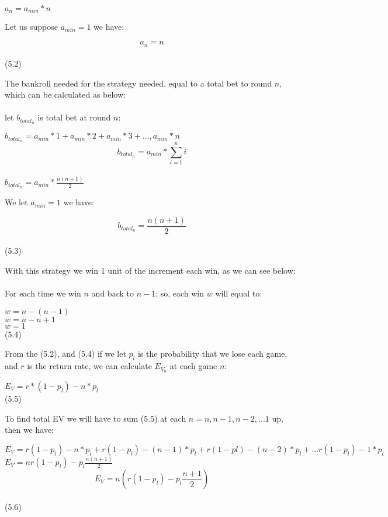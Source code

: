 \documentclass{article}
\begin{document}
\begin{center}
$a_n=a_{min}*n$\\
\end{center}
Let us suppose $a_{min}=1$ we have:\par
\begin{center}
$$a_n=n$$\\
(5.2)
\end{center}
The bankroll needed for the strategy needed, equal to a total bet to round $n$, which can be calculated as below: \\
\\
let $b_{total_n}$ is total bet at round $n$:\par
\begin{center}
$b_{total_n}=a_{min}*1+a_{min}*2+a_{min}*3+...,a_{min}*n$\\
$$b_{total_n}=a_{min}*\sum^{n}_{i=1}i$$\\
$b_{total_n}=a_{min}*\frac{n(n+1)}{2}$\\
\end{center}
We let $a_{min}=1$ we have:
\begin{center}
$$b_{total_n}=\frac{n(n+1)}{2}$$\\
(5.3)\\
\end{center}
With this strategy we win 1 unit of the increment each win, as we can see below:\\ \\
For each time we win $n$ and back to $n-1$: so, each win $w$ will equal to:
\begin{center}
$w=n-(n-1)$\\
$w=n-n+1$\\
$w=1$\\
(5.4)\\
\end{center}

From the (5.2), and (5.4) if we let $p_l$ is the probability that we lose each game, and $r$ is the return rate, we can calculate $E_{V_{n}}$ at each game $n$:\par
\begin{center}
$E_V=r*(1-p_l)-n*p_l$\\ 
(5.5)\\
\end{center}
To find total EV we will have to sum (5.5) at each $n = {n,n-1,n-2,...1}$ up, then we have:\par
\begin{center}
$E_V=r(1-p_l)-n*p_l+r(1-p_l)-(n-1)*p_l+r(1-pl)-(n-2)*p_l+...r(1-p_l)-1*p_l$\\
$E_V=nr(1-p_l)-p_l\frac{n(n+1)}{2}$\\
$$E_V=n(r(1-p_l)-p_l\frac{n+1}{2})$$\\
(5.6)\\
\end{center}
\end{document}
